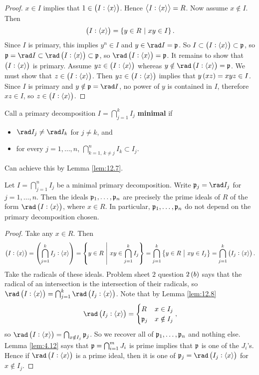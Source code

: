 \begin{proof}
$ x \in I $ implies that $ 1 \in \br{I : \abr{x}} $. Hence $ \left\langle I : \left\langle x \right\rangle \right\rangle = R $. Now assume $ x \notin I $. Then
$$ \br{I : \abr{x}} = \cbr{y \in R \st xy \in I}. $$
Since $ I $ is primary, this implies $ y^n \in I $ and $ y \in \rad I = \ppp $. So $ I \subset \br{I : \abr{x}} \subset \ppp $, so $ \ppp = \rad I \subset \rad \br{I : \abr{x}} \subset \ppp $, so $ \rad \br{I : \abr{x}} = \ppp $. It remains to show that $ \br{I : \abr{x}} $ is primary. Assume $ yz \in \br{I : \abr{x}} $ whereas $ y \notin \rad \br{I : \abr{x}} = \ppp $. We must show that $ z \in \br{I : \abr{x}} $. Then $ yz \in \br{I : \abr{x}} $ implies that $ y\br{xz} = xyz \in I $. Since $ I $ is primary and $ y \notin \ppp = \rad I $, no power of $ y $ is contained in $ I $, therefore $ xz \in I $, so $ z \in \br{I : \abr{x}} $.
\end{proof}

\pagebreak

Call a primary decomposition $ I = \bigcap_{j = 1}^k I_j $ \textbf{minimal} if
\begin{itemize}
\item $ \rad I_j \ne \rad I_k $ for $ j \ne k $, and
\item for every $ j = 1, \dots, n $, $ \bigcap_{k = 1, \ k \ne j}^n I_k \subset I_j $.
\end{itemize}
Can achieve this by Lemma \ref{lem:12.7}.

\begin{theorem}
Let $ I = \bigcap_{j = 1}^n I_j $ be a minimal primary decomposition. Write $ \ppp_j = \rad I_j $ for $ j = 1, \dots, n $. Then the ideals $ \mathfrak{p}_1, \dots, \mathfrak{p}_n $ are precisely the prime ideals of $ R $ of the form $ \rad \br{I : \abr{x}} $, where $ x \in R $. In particular, $ \mathfrak{p}_1, \dots, \mathfrak{p}_n $ do not depend on the primary decomposition chosen.
\end{theorem}


\begin{proof}
Take any $ x \in R $. Then
$$ \br{I : \abr{x}} = \br{\bigcap_{j = 1}^k I_j : \abr{x}} = \cbr{y \in R \st xy \in \bigcap_{j = 1}^k I_j} = \bigcap_{j = 1}^k \cbr{y \in R \st xy \in I_j} = \bigcap_{j = 1}^k \br{I_j : \abr{x}}. $$
Take the radicals of these ideals. Problem sheet $ 2 $ question $ 2\br{b} $ says that the radical of an intersection is the intersection of their radicals, so $ \rad \br{I : \abr{x}} = \bigcap_{j = 1}^k \rad \br{I_j : \abr{x}} $. Note that by Lemma \ref{lem:12.8}
$$ \rad \br{I_j : \abr{x}} =
\begin{cases}
R & x \in I_j \\
\ppp_j & x \notin I_j
\end{cases},
$$
so $ \rad \br{I : \abr{x}} = \bigcap_{x \notin I_j} \ppp_j $. So we recover all of $ \mathfrak{p}_1, \dots, \mathfrak{p}_n $ and nothing else. Lemma \ref{lem:4.12} says that $ \mathfrak{p} = \bigcap_{i = 1}^m J_i $ is prime implies that $ \mathfrak{p} $ is one of the $ J_i $'s. Hence if $ \rad \br{I : \abr{x}} $ is a prime ideal, then it is one of $ \ppp_j = \rad \br{I_j : \abr{x}} $ for $ x \notin I_j $.
\end{proof}

